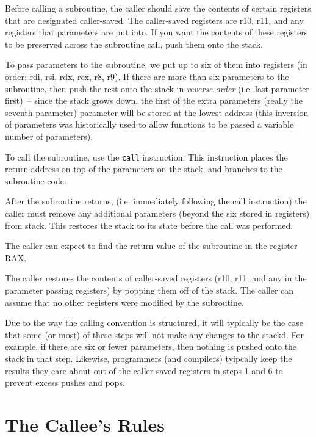 \begin{numlist}
\item Before calling a subroutine, the caller should save the contents
  of certain registers that are designated caller-saved. The
  caller-saved registers are r10, r11, and any registers that
  parameters are put into. If you want the contents of these registers
  to be preserved across the subroutine call, push them onto the
  stack.
\item To pass parameters to the subroutine, we put up to six of them
  into registers (in order: rdi, rsi, rdx, rcx, r8, r9).  If there are
  more than six parameters to the subroutine, then push the rest onto
  the stack in {\em reverse order} (i.e. last parameter first)~--
  since the stack grows down, the first of the extra parameters
  (really the seventh parameter) parameter will be stored at the
  lowest address (this inversion of parameters was historically used
  to allow functions to be passed a variable number of parameters).
\item To call the subroutine, use the {\tt call} instruction. This
  instruction places the return address on top of the parameters on
  the stack, and branches to the subroutine code.
\item After the subroutine returns, (i.e. immediately following the
  call instruction) the caller must remove any additional parameters
  (beyond the six stored in registers) from stack.  This restores the
  stack to its state before the call was performed.
\item The caller can expect to find the return value of the subroutine
  in the register RAX.
\item The caller restores the contents of caller-saved registers (r10,
  r11, and any in the parameter passing registers) by popping them off
  of the stack. The caller can assume that no other registers were
  modified by the subroutine.
\end{numlist}

Due to the way the calling convention is structured, it will typically
be the case that some (or most) of these steps will not make any
changes to the stackd.  For example, if there are six or fewer
parameters, then nothing is pushed onto the stack in that step.
Likewise, programmers (and compilers) tyipcally keep the results they
care about out of the caller-saved registers in steps 1 and 6 to
prevent excess pushes and pops.

\section{The Callee's Rules}

